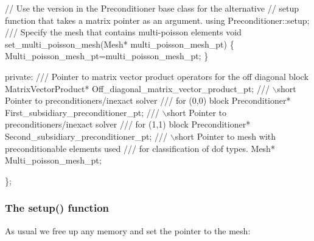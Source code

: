 \begin{DoxyCodeInclude}
  \textcolor{comment}{// Use the version in the Preconditioner base class for the alternative}
  \textcolor{comment}{// setup function that takes a matrix pointer as an argument.}
  \textcolor{keyword}{using} Preconditioner::setup;
\textcolor{comment}{}
\textcolor{comment}{  /// Specify the mesh that contains multi-poisson elements}
\textcolor{comment}{}  \textcolor{keywordtype}{void} set\_multi\_poisson\_mesh(Mesh* multi\_poisson\_mesh\_pt)
  \{
   Multi\_poisson\_mesh\_pt=multi\_poisson\_mesh\_pt;
  \}

 \textcolor{keyword}{private}:  
\textcolor{comment}{}
\textcolor{comment}{  /// Pointer to matrix vector product operators for the off diagonal block}
\textcolor{comment}{}  MatrixVectorProduct* Off\_diagonal\_matrix\_vector\_product\_pt;
\textcolor{comment}{}
\textcolor{comment}{  /// \(\backslash\)short Pointer to preconditioners/inexact solver}
\textcolor{comment}{  /// for (0,0) block}
\textcolor{comment}{}  Preconditioner* First\_subsidiary\_preconditioner\_pt;
  \textcolor{comment}{}
\textcolor{comment}{  /// \(\backslash\)short Pointer to preconditioners/inexact solver}
\textcolor{comment}{  /// for (1,1) block}
\textcolor{comment}{}  Preconditioner* Second\_subsidiary\_preconditioner\_pt;
\textcolor{comment}{}
\textcolor{comment}{  /// \(\backslash\)short Pointer to mesh with preconditionable elements used}
\textcolor{comment}{  /// for classification of dof types.}
\textcolor{comment}{}  Mesh* Multi\_poisson\_mesh\_pt;

 \};

\end{DoxyCodeInclude}
\hypertarget{index_two_plus_three_upper_triangular_with_sub_setup}{}\subsubsection{The setup() function}\label{index_two_plus_three_upper_triangular_with_sub_setup}
As usual we free up any memory and set the pointer to the mesh\+:


